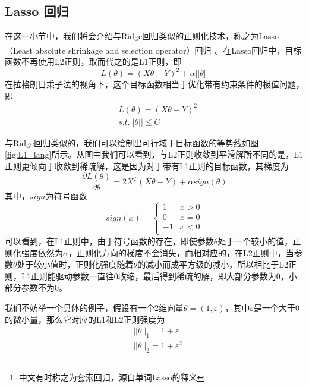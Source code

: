 \subsection{Lasso 回归} %
\label{sub:lasso_回归}
在这一小节中，我们将会介绍与Ridge回归类似的正则化技术，称之为Lasso（Least absolute shrinkage and selection operator）回归\footnote{中文有时称之为套索回归，源自单词Lasso的释义}。在Lasso回归中，目标函数不再使用L2正则，取而代之的是L1正则，即
\begin{equation} \label{equ:L1_loss}
	L(\theta) = (X\theta -Y)^2 + \alpha ||\theta||
\end{equation}
在拉格朗日乘子法的视角下，这个目标函数相当于优化带有约束条件的极值问题，即
\begin{equation}\label{equ:lang_L1}
	\begin{split}
		&L(\theta) = (X\theta -Y)^2 \\
		&s.t. ||\theta|| \leq C
	\end{split}
\end{equation}

与Ridge回归类似的，我们可以绘制出可行域于目标函数的等势线如图\ref{fig:L1_lang}所示。从图中我们可以看到，与L2正则收敛到平滑解所不同的是，L1正则更倾向于收敛到稀疏解，这是因为对于带有L1正则的目标函数，其梯度为
\begin{equation}\label{equ:L1_grad}
	\frac{\partial L(\theta)}{\partial \theta} = 2X^T(X\theta - Y) + \alpha sign(\theta)
\end{equation}
其中，$sign$为符号函数
\begin{equation}
	sign(x) = \left\{\begin{array}{cc}
	1 &x > 0\\
	0 &x = 0\\
	-1 & x < 0\\
	\end{array}
	\right.
\end{equation}
可以看到，在L1正则中，由于符号函数的存在，即使参数$\theta$处于一个较小的值，正则化强度依然为$\alpha$，正则化方向的梯度不会消失，而相对应的，在L2正则中，当参数$\theta$处于较小值时，正则化强度随着$\theta$的减小而成平方级的减小，所以相比于L2正则，L1正则能驱动参数一直往0收缩，最后得到稀疏的解，即大部分参数为0，小部分参数不为0。

我们不妨举一个具体的例子，假设有一个2维向量$\theta = (1, \varepsilon)$，其中$\varepsilon$是一个大于0的微小量，那么它对应的L1和L2正则强度为
\begin{equation}
\begin{split}
	&||\theta||_1 = 1+ \varepsilon\\
	&||\theta||_2 = 1 + \varepsilon^2
\end{split}
\end{equation}


